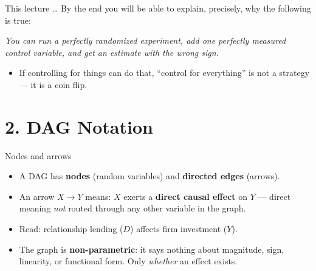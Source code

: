 \documentclass[
  11pt,
  ignorenonframetext,
  aspectratio=169,
]{beamer}
\providecommand{\tightlist}{%
  \setlength{\itemsep}{0pt}\setlength{\parskip}{0pt}}
\begin{document}
\begin{frame}{This lecture \ldots{}}
\protect{}\label{this-lecture}
By the end you will be able to explain, precisely, why the following is
true:

\vspace{0.5em}

\begin{center}
\emph{You can run a perfectly randomized experiment, add one perfectly measured\\
control variable, and get an estimate with the wrong sign.}
\end{center}

\vspace{0.5em}

\begin{itemize}
\tightlist
\item
  If controlling for things can do that, ``control for everything'' is
  not a strategy --- it is a coin flip.
\end{itemize}
\end{frame}

\section{2. DAG Notation}\label{dag-notation}

\begin{frame}{Nodes and arrows}
\protect{}\label{nodes-and-arrows}
\begin{itemize}
\tightlist
\item
  A DAG has \textbf{nodes} (random variables) and \textbf{directed
  edges} (arrows).
\item
  An arrow \(X \to Y\) means: \(X\) exerts a \textbf{direct causal
  effect} on \(Y\) --- direct meaning \emph{not} routed through any
  other variable in the graph.
\end{itemize}

\begin{center}
\end{center}

\begin{itemize}
\tightlist
\item
  Read: relationship lending (\(D\)) affects firm investment (\(Y\)).
\item
  The graph is \textbf{non-parametric}: it says nothing about magnitude,
  sign, linearity, or functional form. Only \emph{whether} an effect
  exists.
\end{itemize}
\end{frame}
\end{document}
